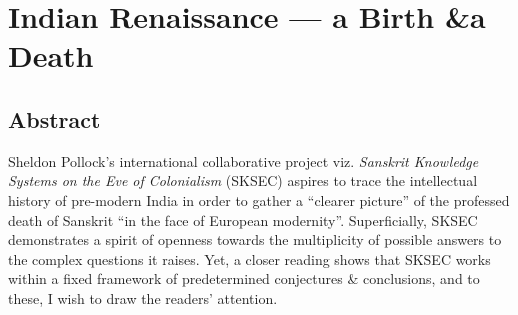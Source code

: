 \chapter[Indian Renaissance — a Birth \& a Death]{Indian Renaissance — a Birth \&\break a Death}\label{chapter7\thechapter:begin}\label{chapter7}



\smallskip
\section*{Abstract}
\smallskip

Sheldon Pollock’s international collaborative project viz. {\sl Sanskrit Knowledge Systems on the Eve of Colonialism} (SKSEC) aspires to trace the intellectual history of pre-modern India in order to gather a “clearer picture” of the professed death of Sanskrit “in the face of European modernity”. Superficially, SKSEC demonstrates a spirit of openness towards the multiplicity of possible answers to the complex questions it raises. Yet, a closer reading shows that SKSEC works within a fixed framework of predetermined conjectures \& conclusions, and to these, I wish to draw the readers’ attention. 


